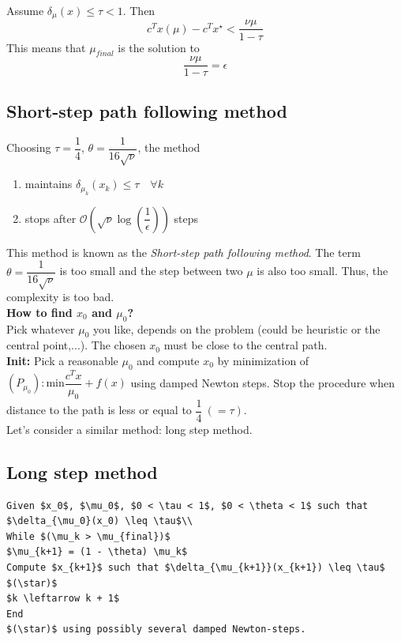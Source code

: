 \begin{theorem}
Assume $\delta_{\mu}(x) \leq \tau < 1$. Then
$$c^T x(\mu) - c^T x^{\star} < \frac{\nu\mu}{1 - \tau}$$
This means that $\mu_{final}$ is the solution to
$$\frac{\nu\mu}{1 - \tau} = \epsilon$$
\end{theorem}

\subsection{Short-step path following method}

\begin{theorem}
Choosing $\tau = \dfrac{1}{4}$, $\theta = \dfrac{1}{16 \sqrt{\nu}}$, the method 
\begin{enumerate}
\item maintains $\delta_{\mu_k}(x_k) \leq \tau \quad \forall k$ 
\item stops after $\mathcal{O}(\sqrt{\nu} \log(\dfrac{1}{\epsilon}))$ steps
\end{enumerate}
\end{theorem}

This method is known as the \textit{Short-step path following method}. The term $\theta = \dfrac{1}{16 \sqrt{\nu}}$ is too small and the step between two $\mu$ is also too small. Thus, the complexity is too bad.\\

\textbf{How to find $x_0$ and $\mu_0$?}\\
Pick whatever $\mu_0$ you like, depends on the problem (could be heuristic or the central point,...). The chosen $x_0$ must be close to the central path.\\
\textbf{Init:} Pick a reasonable $\mu_0$ and compute $x_0$ by minimization of $(P_{\mu_0}):  \text{min} \dfrac{c^T x}{\mu_0} + f(x)$ using damped Newton steps. Stop the procedure when distance to the path is less or equal to $\dfrac{1}{4}\ (=\tau)$.\\
Let's consider a similar method: long step method.

\subsection{Long step method}

\begin{lstlisting}[mathescape,caption=Long step method]
Given $x_0$, $\mu_0$, $0 < \tau < 1$, $0 < \theta < 1$ such that $\delta_{\mu_0}(x_0) \leq \tau$\\
While $(\mu_k > \mu_{final})$
$\mu_{k+1} = (1 - \theta) \mu_k$ 
Compute $x_{k+1}$ such that $\delta_{\mu_{k+1}}(x_{k+1}) \leq \tau$ $(\star)$
$k \leftarrow k + 1$
End
$(\star)$ using possibly several damped Newton-steps. 
\end{lstlisting}

